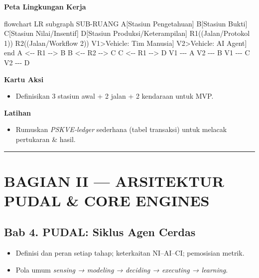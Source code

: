 \documentclass[
  letterpaper,
  DIV=11,
  numbers=noendperiod]{scrartcl}
\newenvironment{Shaded}{\begin{snugshade}}{\end{snugshade}}
\newcommand{\NormalTok}[1]{\textcolor[rgb]{0.00,0.23,0.31}{#1}}
\providecommand{\tightlist}{%
  \setlength{\itemsep}{0pt}\setlength{\parskip}{0pt}}
\begin{document}
\textbf{Peta Lingkungan Kerja}

\begin{Shaded}
\begin{Highlighting}[]
\NormalTok{flowchart LR}
\NormalTok{  subgraph SUB{-}RUANG}
\NormalTok{    A[Stasiun Pengetahuan]}
\NormalTok{    B[Stasiun Bukti]}
\NormalTok{    C[Stasiun Nilai/Insentif]}
\NormalTok{    D[Stasiun Produksi/Keterampilan]}
\NormalTok{    R1((Jalan/Protokol 1))}
\NormalTok{    R2((Jalan/Workflow 2))}
\NormalTok{    V1\textgreater{}Vehicle: Tim Manusia]}
\NormalTok{    V2\textgreater{}Vehicle: AI Agent]}
\NormalTok{  end}
\NormalTok{  A \textless{}{-}{-} R1 {-}{-}\textgreater{} B}
\NormalTok{  B \textless{}{-}{-} R2 {-}{-}\textgreater{} C}
\NormalTok{  C \textless{}{-}{-} R1 {-}{-}\textgreater{} D}
\NormalTok{  V1 {-}{-}{-} A}
\NormalTok{  V2 {-}{-}{-} B}
\NormalTok{  V1 {-}{-}{-} C}
\NormalTok{  V2 {-}{-}{-} D}
\end{Highlighting}
\end{Shaded}

\textbf{Kartu Aksi}

\begin{itemize}
\tightlist
\item
  Definisikan 3 stasiun awal + 2 jalan + 2 kendaraan untuk MVP.
\end{itemize}

\textbf{Latihan}

\begin{itemize}
\tightlist
\item
  Rumuskan \emph{PSKVE‑ledger} sederhana (tabel transaksi) untuk melacak
  pertukaran \& hasil.
\end{itemize}

\begin{center}\rule{0.5\linewidth}{0.5pt}\end{center}

\section{BAGIAN II --- ARSITEKTUR PUDAL \& CORE
ENGINES}\label{bagian-ii-arsitektur-pudal-core-engines}

\subsection{Bab 4. PUDAL: Siklus Agen
Cerdas}\label{bab-4.-pudal-siklus-agen-cerdas}

\begin{itemize}
\tightlist
\item
  Definisi dan peran setiap tahap; keterkaitan NI--AI--CI; pemosisian
  metrik.
\item
  Pola umum \emph{sensing → modeling → deciding → executing → learning}.
\end{itemize}
\end{document}
